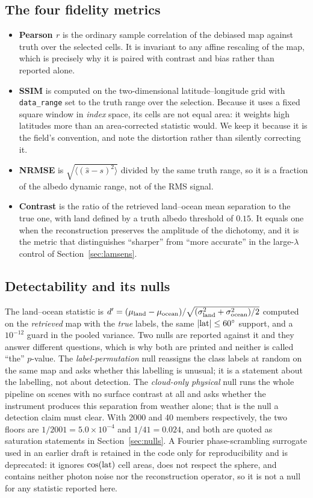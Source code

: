\documentclass[twocolumn,10pt]{article}
\begin{document}
\subsection{The four fidelity metrics}
\begin{itemize}
\item \textbf{Pearson $r$} is the ordinary sample correlation of the debiased
map against truth over the selected cells. It is invariant to any affine
rescaling of the map, which is precisely why it is paired with contrast and bias
rather than reported alone.
\item \textbf{SSIM} is computed on the two-dimensional latitude--longitude grid
with \texttt{data\_range} set to the truth range over the selection. Because it
uses a fixed square window in \emph{index} space, its cells are not equal area:
it weights high latitudes more than an area-corrected statistic would. We keep
it because it is the field's convention, and note the distortion rather than
silently correcting it.
\item \textbf{NRMSE} is $\sqrt{\langle(\hat{s}-s)^2\rangle}$ divided by the same
truth range, so it is a fraction of the albedo dynamic range, not of the RMS
signal.
\item \textbf{Contrast} is the ratio of the retrieved land--ocean mean
separation to the true one, with land defined by a truth albedo threshold of
$0.15$. It equals one when the reconstruction preserves the amplitude of the
dichotomy, and it is the metric that distinguishes ``sharper'' from ``more
accurate'' in the large-$\lambda$ control of Section~\ref{sec:lamsens}.
\end{itemize}

\subsection{Detectability and its nulls}
The land--ocean statistic is
$d'=(\mu_{\rm land}-\mu_{\rm ocean})/\sqrt{(\sigma^2_{\rm land}+\sigma^2_{\rm ocean})/2}$
computed on the \emph{retrieved} map with the \emph{true} labels, the same
$|{\rm lat}|\le60^\circ$ support, and a $10^{-12}$ guard in the pooled variance.
Two nulls are reported against it and they answer different questions, which is
why both are printed and neither is called ``the'' $p$-value. The
\emph{label-permutation} null reassigns the class labels at random on the same
map and asks whether this labelling is unusual; it is a statement about the
labelling, not about detection. The \emph{cloud-only physical} null runs the
whole pipeline on scenes with no surface contrast at all and asks whether the
instrument produces this separation from weather alone; that is the null a
detection claim must clear. With 2000 and 40 members respectively, the two
floors are $1/2001=5.0\times10^{-4}$ and $1/41=0.024$, and both are quoted as
saturation statements in Section~\ref{sec:nulls}. A Fourier phase-scrambling
surrogate used in an earlier draft is retained in the code only for
reproducibility and is deprecated: it ignores $\cos({\rm lat})$ cell areas, does
not respect the sphere, and contains neither photon noise nor the reconstruction
operator, so it is not a null for any statistic reported here.
\end{document}
